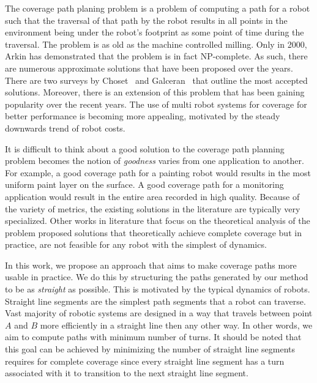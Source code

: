 \documentclass[../main.tex]{subfiles}
\begin{document}
The coverage path planing problem is a problem of computing a path for a robot such that the traversal of that path by the robot results in all points in the environment being under the robot's footprint as some point of time during the traversal. The problem is as old as the machine controlled milling. Only in 2000, Arkin\cite{arkin2000approximation} has demonstrated that the problem is in fact NP-complete. As such, there are numerous approximate solutions that have been proposed over the years. There are two surveys by Choset~\cite{choset2000coverage} and Galceran~\cite{galceran2013survey} that outline the most accepted solutions. Moreover, there is an extension of this problem that has been gaining popularity over the recent years. The use of multi robot systems for coverage for better performance is becoming more appealing, motivated by the steady downwards trend of robot costs.

It is difficult to think about a good solution to the coverage path planning problem becomes the notion of \emph{goodness} varies from one application to another. For example, a good coverage path for a painting robot would results in the most uniform paint layer on the surface. A good coverage path for a monitoring application would result in the entire area recorded in high quality. Because of the variety of metrics, the existing solutions in the literature are typically very specialized. Other works in literature that focus on the theoretical analysis of the problem proposed solutions that theoretically achieve complete coverage but in practice, are not feasible for any robot with the simplest of dynamics.

In this work, we propose an approach that aims to make coverage paths more usable in practice. We do this by structuring the paths generated by our method to be as \emph{straight} as possible. This is motivated by the typical dynamics of robots. Straight line segments are the simplest path segments that a robot can traverse. Vast majority of robotic systems are designed in a way that travels between point $A$ and $B$ more efficiently in a straight line then any other way. In other words, we aim to compute paths with minimum number of turns. It should be noted that this goal can be achieved by minimizing the number of straight line segments requires for complete coverage since every straight line segment has a turn associated with it to transition to the next straight line segment.
\end{document}
